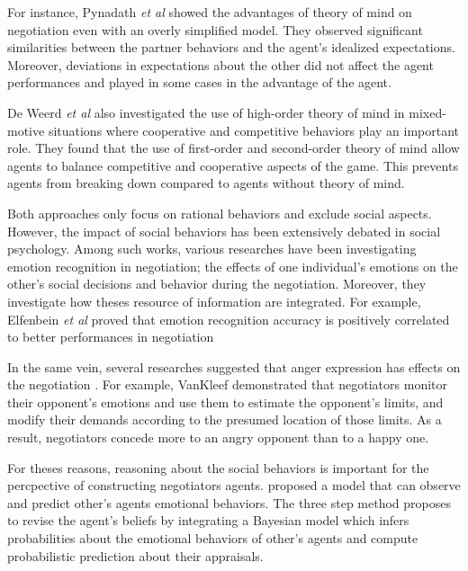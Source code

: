 \documentclass[sigconf]{aamas}  %
\begin{document}
	For instance, Pynadath \textit{et al}\cite{pynadath2013you} showed the advantages of theory of mind on negotiation even with an overly simplified model. They observed significant similarities between	the partner behaviors and the agent's idealized expectations. Moreover, deviations in expectations about the other did not affect the agent performances and played in some cases in the advantage of the agent.
	
	De Weerd \textit{et al} \cite{de2013higher} also investigated the use of high-order theory of mind in mixed-motive situations where cooperative and competitive behaviors play an important role. They found that the use of first-order and second-order theory of mind allow agents to balance competitive and cooperative	aspects of the game. This prevents agents from breaking down compared to  agents without theory of mind.
	
	
	Both approaches only focus on rational behaviors and exclude social aspects. However, the impact of social behaviors has been extensively debated in social psychology. Among such works, various researches have been investigating emotion recognition in negotiation; the effects of one individual's	emotions on the other's social decisions and behavior during the negotiation. Moreover, they investigate how theses resource of information are integrated.
	For example, Elfenbein\textit{ et al} \cite{elfenbein2007reading} proved that  emotion recognition accuracy is positively correlated to  better performances in negotiation
	
	In the same vein, several researches suggested that anger expression has effects on the negotiation \cite{sinaceur2006get,van2010interpersonal,ferguson2004social}. For example, VanKleef \cite{van2004interpersonal} demonstrated that negotiators monitor their opponent's emotions and use them to estimate the opponent's limits, and modify their demands according to the presumed location of those limits. As a result, negotiators concede more to an angry opponent than to a happy one. 
	
	
	For theses reasons, reasoning about the social behaviors is important for the percpective of constructing negotiators agents. \cite{alfonso2015emotional} proposed a model that can observe and predict other's agents emotional behaviors. The three step method proposes to revise the agent's  beliefs by integrating a Bayesian model which infers probabilities about the emotional behaviors of other's agents and compute probabilistic prediction about their appraisals.
	
\end{document}
